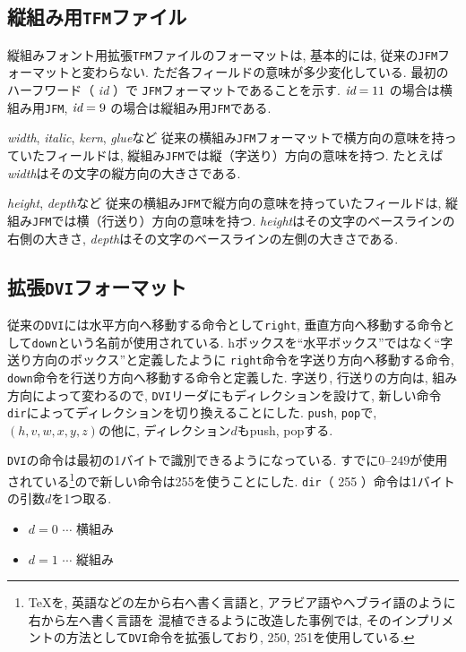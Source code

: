 \subsection{縦組み用{\tt TFM}ファイル}

縦組みフォント用拡張{\tt TFM}ファイルのフォーマットは, 基本的には,
従来の{\tt JFM}フォーマット\cite{jfm}と変わらない.
ただ各フィールドの意味が多少変化している.
最初のハーフワード（\kern0pt {\it id}\kern0pt ）で
{\tt JFM}フォーマットであることを示す.
$\hbox{\it id} = 11$ の場合は横組み用{\tt JFM},
$\hbox{\it id} = 9$ の場合は縦組み用{\tt JFM}である.

{\it width}, {\it italic}, {\it kern}, {\it glue}など
従来の横組み{\tt JFM}フォーマットで横方向の意味を持っていたフィールドは,
縦組み{\tt JFM}では縦（字送り）方向の意味を持つ.
たとえば{\it width}はその文字の縦方向の大きさである.

{\it height}, {\it depth}など
従来の横組み{\tt JFM}で縦方向の意味を持っていたフィールドは,
縦組み{\tt JFM}では横（行送り）方向の意味を持つ.
{\it height}はその文字のベースラインの右側の大きさ,
{\it depth}はその文字のベースラインの左側の大きさである.

\subsection{拡張{\tt DVI}フォーマット}

従来の\verb|DVI|には水平方向へ移動する命令として\verb|right|,
垂直方向へ移動する命令として\verb|down|という名前が使用されている.
hボックスを``水平ボックス''ではなく``字送り方向のボックス''と定義したように
\verb|right|命令を字送り方向へ移動する命令,
\verb|down|命令を行送り方向へ移動する命令と定義した.
字送り, 行送りの方向は, 組み方向によって変わるので,
\verb|DVI|リーダにもディレクションを設けて,
新しい命令\verb|dir|によってディレクションを切り換えることにした.
\verb|push|, \verb|pop|で, $(h,v,w,x,y,z)$の他に,
ディレクション$d$もpush, popする.

\verb|DVI|の命令は最初の1バイトで識別できるようになっている.
すでに0--249が使用されている\footnote{
	\TeX を, 英語などの左から右へ書く言語と,
	アラビア語やヘブライ語のように右から左へ書く言語を
	混植できるように改造した事例\cite{arabic}では,
	そのインプリメントの方法として\verb|DVI|命令を拡張しており,
	250, 251を使用している.
}ので新しい命令は255を使うことにした.
\verb|dir|（\kern0pt 255\kern0pt ）命令は1バイトの引数$d$を1つ取る.
\begin{itemize}
\item $d=0$ $\cdots$ 横組み
\item $d=1$ $\cdots$ 縦組み
\end{itemize}

